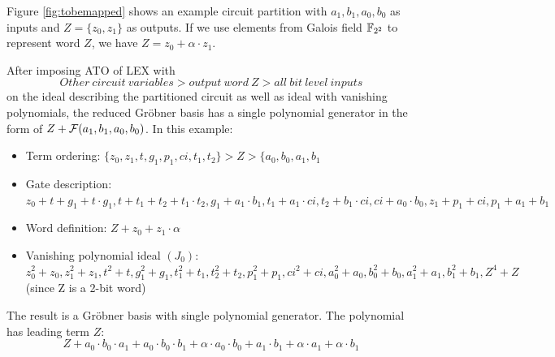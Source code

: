 Figure \ref{fig:tobemapped} shows an example circuit partition with $a_1,b_1,a_0,b_0$ as inputs and
$Z = \{z_0,z_1\}$ as outputs. If we use elements from Galois field ${\mathbb{F}}_{2^2}$ to represent word $Z$,
we have $Z = z_0 + \alpha\cdot z_1$.

After imposing ATO of LEX with
$$Other\ circuit\ variables > output\ word\ Z > all\ bit\ level\ inputs$$
on the ideal describing the partitioned circuit as well as ideal with vanishing polynomials,
the reduced Gr\"obner basis has a single polynomial generator in the form of $Z + {\mathcal{F}}(a_1,b_1,a_0,b_0)$.
In this example:

\begin{itemize}
\item Term ordering: $\{z_0,z_1,t,g_1,p_1,ci,t_1,t_2\}>Z>\{a_0,b_0,a_1,b_1$
\item Gate description: $z_0+t+g_1+t\cdot g_1, t+t_1+t_2+t_1\cdot t_2, g_1+a_1\cdot b_1,
			t_1+a_1\cdot ci, t_2+b_1\cdot ci, ci+a_0\cdot b_0, z_1+p_1+ci, p_1+a_1+b_1$
\item Word definition: $Z+z_0+z_1\cdot \alpha$
\item Vanishing polynomial ideal $(J_0)$: $z_0^2+z_0, z_1^2+z_1, t^2+t, g_1^2+g_1, t_1^2+t_1, t_2^2+t_2, p_1^2+p_1, ci^2+ci,
			a_0^2+a_0, b_0^2+b_0, a_1^2+a_1, b_1^2+b_1, Z^4+Z$(since Z is a 2-bit word)
\end{itemize}

The result is a Gr\"obner basis with single polynomial generator. The polynomial has leading term $Z$:
$$Z+a_0\cdot b_0\cdot a_1+a_0\cdot b_0\cdot b_1+\alpha\cdot a_0\cdot b_0+a_1\cdot b_1+\alpha\cdot a_1+\alpha\cdot b_1$$


